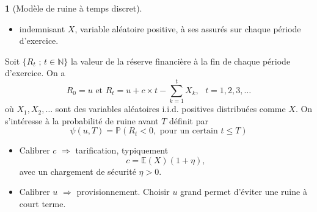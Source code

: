 \documentclass[8pt,notheorems]{beamer}
\theoremstyle{definition}
\theoremstyle{example}
\newtheorem{example}{\translate{Example}}
\theoremstyle{mystyle}
\theoremstyle{plain}
\begin{document}
\begin{frame}[allowframebreaks]
\begin{example}[Modèle de ruine à temps discret]
\begin{itemize}
\item indemnisant $X$, variable aléatoire positive, à ses assurés sur chaque période d'exercice.
\end{itemize}
Soit $\{R_t\text{ ; }t\in\mathbb{N}\}$ la valeur de la réserve financière à la fin de chaque période d'exercice. On a
$$
R_0=u\text{ et }R_t=u+c\times t - \sum_{k=1}^{t}X_k,\text{ }t=1,2,3,\ldots
$$
où $X_1,X_2,\ldots$ sont des variables aléatoires i.i.d. positives distribuées comme $X$. On s'intéresse à la probabilité de ruine avant $T$ définit par
$$
\psi(u,T)=\mathbb{P}(R_t<0,\text{ pour un certain }t\leq T)
$$
\begin{itemize}
\item Calibrer $c$ $\Rightarrow$ tarification, typiquement
$$
c=\mathbb{E}(X)(1+\eta),
$$
avec un chargement de sécurité $\eta>0$.
\item Calibrer $u$ $\Rightarrow$ provisionnement. Choisir $u$ grand permet d'éviter une ruine à court terme.
\end{itemize}
\end{example}
\end{frame}
\end{document}
